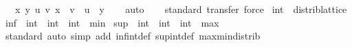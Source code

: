 \begin{isabellebody}
\ \ \ {\isachardoublequoteopen}{\isasymlambda}{\isacharparenleft}{\kern0pt}x{\isacharcomma}{\kern0pt}\ y{\isacharparenright}{\kern0pt}\ {\isacharparenleft}{\kern0pt}u{\isacharcomma}{\kern0pt}\ v{\isacharparenright}{\kern0pt}{\isachardot}{\kern0pt}\ x\ {\isacharplus}{\kern0pt}\ v\ {\isacharless}{\kern0pt}\ u\ {\isacharplus}{\kern0pt}\ y{\isachardoublequoteclose}\isanewline
%
\isadelimproof
\ \ %
\endisadelimproof
%
\isatagproof
{}\isamarkupfalse%
\ auto%
\endisatagproof
{\isafoldproof}%
%
\isadelimproof
\isanewline
%
\endisadelimproof
\isanewline
{}\isamarkupfalse%
\isanewline
%
\isadelimproof
\ \ %
\endisadelimproof
%
\isatagproof
{}\isamarkupfalse%
\ standard\ {\isacharparenleft}{\kern0pt}transfer{\isacharcomma}{\kern0pt}\ force{\isacharparenright}{\kern0pt}{\isacharplus}{\kern0pt}%
\endisatagproof
{\isafoldproof}%
%
\isadelimproof
\isanewline
%
\endisadelimproof
\isanewline
{}\isamarkupfalse%
\isanewline
\isanewline
{}\isamarkupfalse%
\ int\ {\isacharcolon}{\kern0pt}{\isacharcolon}{\kern0pt}\ distrib{\isacharunderscore}{\kern0pt}lattice\isanewline
{}\isanewline
\isanewline
{}\isamarkupfalse%
\ {\isachardoublequoteopen}{\isacharparenleft}{\kern0pt}inf\ {\isacharcolon}{\kern0pt}{\isacharcolon}{\kern0pt}\ int\ {\isasymRightarrow}\ int\ {\isasymRightarrow}\ int{\isacharparenright}{\kern0pt}\ {\isacharequal}{\kern0pt}\ min{\isachardoublequoteclose}\isanewline
\isanewline
{}\isamarkupfalse%
\ {\isachardoublequoteopen}{\isacharparenleft}{\kern0pt}sup\ {\isacharcolon}{\kern0pt}{\isacharcolon}{\kern0pt}\ int\ {\isasymRightarrow}\ int\ {\isasymRightarrow}\ int{\isacharparenright}{\kern0pt}\ {\isacharequal}{\kern0pt}\ max{\isachardoublequoteclose}\isanewline
\isanewline
{}\isamarkupfalse%
\isanewline
%
\isadelimproof
\ \ %
\endisadelimproof
%
\isatagproof
{}\isamarkupfalse%
\ standard\ {\isacharparenleft}{\kern0pt}auto\ simp\ add{\isacharcolon}{\kern0pt}\ inf{\isacharunderscore}{\kern0pt}int{\isacharunderscore}{\kern0pt}def\ sup{\isacharunderscore}{\kern0pt}int{\isacharunderscore}{\kern0pt}def\ max{\isacharunderscore}{\kern0pt}min{\isacharunderscore}{\kern0pt}distrib{}{\isacharparenright}{\kern0pt}%
\endisatagproof
{\isafoldproof}%
%
\isadelimproof
\isanewline
%
\endisadelimproof
\isanewline
{}\isamarkupfalse%
%
\isadelimdocument
%
\endisadelimdocument
%
\isatagdocument
%
\isamarkuptrue%

\end{isabellebody}
